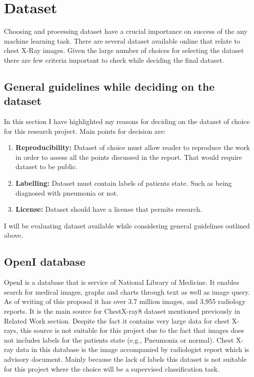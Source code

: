 \documentclass[12pt, twoside, a4paper]{article}
\begin{document}
\section{Dataset}
Choosing and processing dataset have a crucial importance on success of the any machine learning task. There are several dataset available online that relate to chest X-Ray images. Given the large number of choices for selecting the dataset there are few criteria important to check while deciding the final dataset.

\subsection{General guidelines while deciding on the dataset}
In this section I have highlighted my reasons for deciding on the dataset of choice for this research project. Main points for decision are:
\begin{enumerate}
    \item \textbf{Reproducibility: }Dataset of choice must allow reader to reproduce the work in order to assess all the points discussed in the report. That would require dataset to be public.
    \item \textbf{Labelling: }Dataset must contain labels of patients state. Such as being diagnosed with pneumonia or not.
    \item \textbf{License: }Dataset should have a license that permits research.
\end{enumerate}
I will be evaluating dataset available while considering general guidelines outlined above.

\subsection{OpenI database}

OpenI\cite{openi} is a database that is service of National Library of Medicine. It enables search for medical images, graphs and charts through text as well as image query. As of writing of this proposal it has over 3.7 million images, and 3,955 radiology reports. It is the main source for ChestX-ray8 dataset mentioned previously in Related Work section. Despite the fact it contains very large data for chest X-rays, this source is not suitable for this project due to the fact that images does not includes labels for the patients state (e.g., Pneumonia or normal). Chest X-ray data in this database is the image accompanied by radiologist report which is advisory document. Mainly because the lack of labels this dataset is not suitable for this project where the choice will be a supervised classification task.
\end{document}
